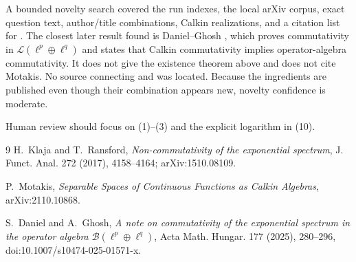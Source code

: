 \documentclass[11pt]{article}
\theoremstyle{remark}
\newcommand{\cL}{\mathcal L}
\begin{document}
A bounded novelty search covered the run indexes, the local arXiv corpus,
exact question text, author/title combinations, Calkin realizations, and a
citation list for \cite{KR}.  The closest later result found is
Daniel--Ghosh \cite{DG}, which proves commutativity in
$\cL(\ell^p\oplus\ell^q)$ and states that Calkin commutativity implies
operator-algebra commutativity.  It does not give the existence theorem
above and does not cite Motakis.  No source connecting \cite{KR} and
\cite{Motakis} was located.  Because the ingredients are published even
though their combination appears new, novelty confidence is moderate.

Human review should focus on (1)--(3) and the explicit logarithm in (10).

\begin{thebibliography}{9}
H.~Klaja and T.~Ransford,
\emph{Non-commutativity of the exponential spectrum},
J. Funct. Anal. 272 (2017), 4158--4164; arXiv:1510.08109.

P.~Motakis,
\emph{Separable Spaces of Continuous Functions as Calkin Algebras},
arXiv:2110.10868.

S.~Daniel and A.~Ghosh,
\emph{A note on commutativity of the exponential spectrum in the operator
algebra $\mathcal B(\ell^p\oplus\ell^q)$},
Acta Math. Hungar. 177 (2025), 280--296,
doi:10.1007/s10474-025-01571-x.
\end{thebibliography}
\end{document}
